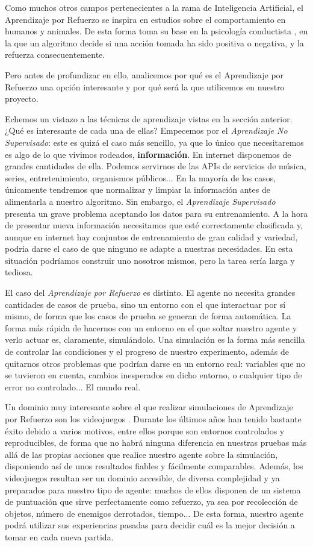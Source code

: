 Como muchos otros campos pertenecientes a la rama de Inteligencia Artificial, el Aprendizaje por Refuerzo \citet{Watkins1992} se inspira en estudios sobre el comportamiento en humanos y animales. De esta forma toma su base en la psicología conductista \citet{Skinner1953}, en la que un algoritmo decide si una acción tomada ha sido positiva o negativa, y la refuerza consecuentemente.

Pero antes de profundizar en ello, analicemos por qué es el Aprendizaje por Refuerzo una opción interesante y por qué será la que utilicemos en nuestro proyecto.

Echemos un vistazo a las técnicas de aprendizaje vistas en la sección anterior. ¿Qué es interesante de cada una de ellas? Empecemos por el \textit{Aprendizaje No Supervisado}: este es quizá el caso más sencillo, ya que lo único que necesitaremos es algo de lo que vivimos rodeados, \textbf{información}. En internet disponemos de grandes cantidades de ella. Podemos servirnos de las APIs de servicios de música, series, entretenimiento, organismos públicos... En la mayoría de los casos, únicamente tendremos que normalizar y limpiar la información antes de alimentarla a nuestro algoritmo. Sin embargo, el \textit{Aprendizaje Supervisado} presenta un grave problema aceptando los datos para su entrenamiento. A la hora de presentar nueva información necesitamos que esté correctamente clasificada y, aunque en internet hay conjuntos de entrenamiento de gran calidad y variedad, podría darse el caso de que ninguno se adapte a nuestras necesidades. En esta situación podríamos construir uno nosotros mismos, pero la tarea sería larga y tediosa.

El caso del \textit{Aprendizaje por Refuerzo} es distinto. El agente no necesita grandes cantidades de casos de prueba, sino un entorno con el que interactuar por sí mismo, de forma que los casos de prueba se generan de forma automática. La forma más rápida de hacernos con un entorno en el que soltar nuestro agente y verlo actuar es, claramente, simulándolo. Una simulación es la forma más sencilla de controlar las condiciones y el progreso de nuestro experimento, además de quitarnos otros problemas que podrían darse en un entorno real: variables que no se tuvieron en cuenta, cambios inesperados en dicho entorno, o cualquier tipo de error no controlado... El mundo real.

Un dominio muy interesante sobre el que realizar simulaciones de Aprendizaje por Refuerzo son los videojuegos \citet{Rodriguez2018}. Durante los últimos años han tenido bastante éxito debido a varios motivos, entre ellos porque son entornos controlados y reproducibles, de forma que no habrá ninguna diferencia en nuestras pruebas más allá de las propias acciones que realice nuestro agente sobre la simulación, disponiendo así de unos resultados fiables y fácilmente comparables. Además, los videojuegos resultan ser un dominio accesible, de diversa complejidad y ya preparados para nuestro tipo de agente: muchos de ellos disponen de un sistema de puntuación que sirve perfectamente como refuerzo, ya sea por recolección de objetos, número de enemigos derrotados, tiempo... De esta forma, nuestro agente podrá utilizar sus experiencias pasadas para decidir cuál es la mejor decisión a tomar en cada nueva partida.

